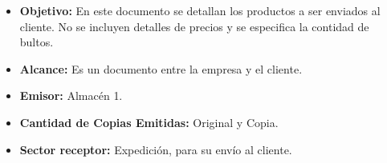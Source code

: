  \begin{itemize}
	  \item \textbf{Objetivo:} En este documento se detallan los productos a ser enviados al cliente. No se incluyen detalles de precios y se especifica la contidad de bultos.
	  \item \textbf{Alcance:} Es un documento entre la empresa y el cliente.
	  \item \textbf{Emisor:} Almacén 1.
	  \item \textbf{Cantidad de Copias Emitidas:} Original y Copia.
	  \item \textbf{Sector receptor:} Expedición, para su envío al cliente.
 \end{itemize}





